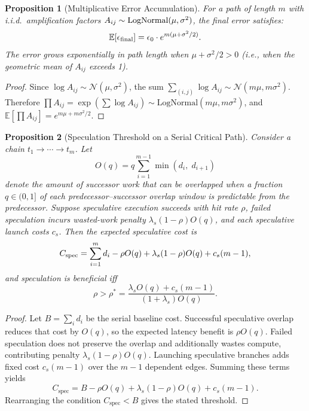 \documentclass[10pt, twocolumn]{article}
\newtheorem{proposition}{Proposition}
\begin{document}
\begin{proposition}[Multiplicative Error Accumulation]
\label{prop:error}
For a path of length $m$ with i.i.d.\ amplification factors $A_{ij} \sim \textup{LogNormal}(\mu, \sigma^2)$, the final error satisfies:
\begin{equation}
    \mathbb{E}[\epsilon_{\textup{final}}] = \epsilon_0 \cdot e^{m(\mu + \sigma^2/2)}.
\end{equation}
The error grows exponentially in path length when $\mu + \sigma^2/2 > 0$ (i.e., when the geometric mean of $A_{ij}$ exceeds 1).
\end{proposition}

\begin{proof}
Since $\log A_{ij} \sim \mathcal{N}(\mu, \sigma^2)$, the sum $\sum_{(i,j)} \log A_{ij} \sim \mathcal{N}(m\mu, m\sigma^2)$. Therefore $\prod A_{ij} = \exp(\sum \log A_{ij}) \sim \text{LogNormal}(m\mu, m\sigma^2)$, and $\mathbb{E}[\prod A_{ij}] = e^{m\mu + m\sigma^2/2}$.
\end{proof}

\begin{proposition}[Speculation Threshold on a Serial Critical Path]
\label{prop:speculation}
Consider a chain $t_1 \rightarrow \cdots \rightarrow t_m$. Let
\begin{equation}
    O(q) = q \sum_{i=1}^{m-1} \min(d_i,\; d_{i+1})
\end{equation}
denote the amount of successor work that can be overlapped when a fraction $q \in (0,1]$ of each predecessor--successor overlap window is predictable from the predecessor. Suppose speculative execution succeeds with hit rate $\rho$, failed speculation incurs wasted-work penalty $\lambda_s(1-\rho)O(q)$, and each speculative launch costs $c_s$. Then the expected speculative cost is
\begin{equation}
    C_{\textup{spec}} = \sum_{i=1}^{m} d_i - \rho O(q) + \lambda_s(1-\rho)O(q) + c_s(m-1),
\end{equation}
and speculation is beneficial iff
\begin{equation}
    \rho > \rho^* = \frac{\lambda_s O(q) + c_s(m-1)}{(1+\lambda_s)O(q)}.
\end{equation}
\end{proposition}

\begin{proof}
Let $B = \sum_i d_i$ be the serial baseline cost. Successful speculative overlap reduces that cost by $O(q)$, so the expected latency benefit is $\rho O(q)$. Failed speculation does not preserve the overlap and additionally wastes compute, contributing penalty $\lambda_s(1-\rho)O(q)$. Launching speculative branches adds fixed cost $c_s(m-1)$ over the $m-1$ dependent edges. Summing these terms yields
\[
    C_{\mathrm{spec}} = B - \rho O(q) + \lambda_s(1-\rho)O(q) + c_s(m-1).
\]
Rearranging the condition $C_{\mathrm{spec}} < B$ gives the stated threshold.
\end{proof}
\end{document}
